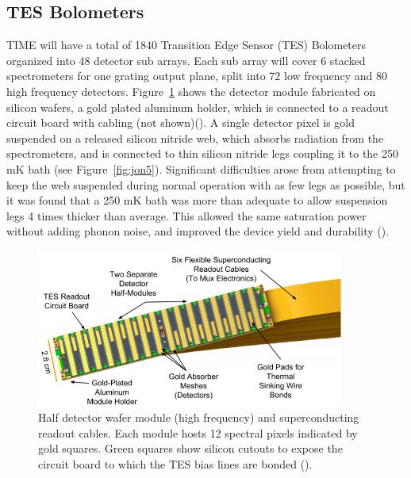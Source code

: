 \documentclass[manuscript]{aastex}
\begin{document}
\subsection{TES Bolometers}
TIME will have a total of 1840 Transition Edge Sensor (TES) Bolometers organized into 48 detector sub arrays. Each sub array will cover 6 stacked spectrometers for one grating output plane, split into 72 low frequency and 80 high frequency detectors. Figure~\ref{fig:jon4} shows the detector module fabricated on silicon wafers, a gold plated aluminum holder, which is connected to a readout circuit board with cabling (not shown)(\cite{Hunacek2016}). A single detector pixel is gold suspended on a released silicon nitride web, which absorbs radiation from the spectrometers, and is connected to thin silicon nitride legs coupling it to the 250 mK bath (see Figure~\ref{fig:jon5}). Significant difficulties arose from attempting to keep the web suspended during normal operation with as few legs as possible, but it was found that a 250 mK bath was more than adequate to allow suspension legs 4 times thicker than average. This allowed the same saturation power without adding phonon noise, and improved the device yield and durability (\cite{Hunacek2016b}). 

\begin{figure}[H]
\centering
\captionsetup{width=0.9\textwidth}
\includegraphics[width=0.9\textwidth]{jon4.PNG}
\caption[Diagram of a Half Detector Module -(\cite{Hunacek2016b})]{Half detector wafer module (high frequency) and superconducting readout cables. Each module hosts 12 spectral pixels indicated by gold squares. Green squares show silicon cutouts to expose the circuit board to which the TES bias lines are bonded (\cite{Hunacek2016b}).}
\label{fig:jon4}
\end{figure}
\end{document}

